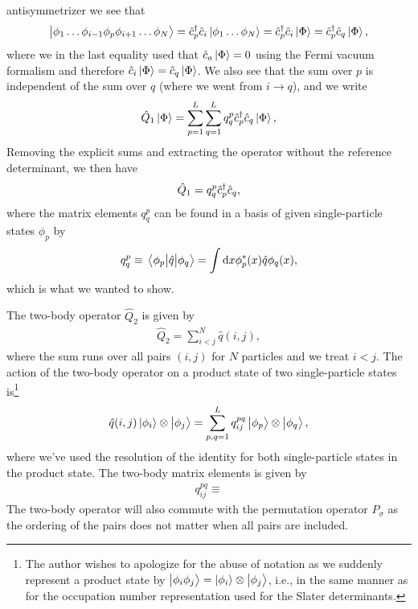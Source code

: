         antisymmetrizer we see that
        \begin{align}
            \ket{\phi_1\dots\phi_{i - 1}\phi_p\phi_{i + 1}\dots\phi_N}
            = \hat{c}_{p}^{\dagger}\hat{c}_{i}\ket{\phi_1\dots\phi_N}
            = \hat{c}_{p}^{\dagger}\hat{c}_{i}\ket{\Phi}
            = \hat{c}_{p}^{\dagger}\hat{c}_{q}\ket{\Phi},
        \end{align}
        where we in the last equality used that $\hat{c}_{a}\ket{\Phi} = 0$ using
        the Fermi vacuum formalism and therefore $\hat{c}_{i}\ket{\Phi} =
        \hat{c}_{q}\ket{\Phi}$.
        We also see that the sum over $p$ is independent of the sum over
        $q$ (where we went from $i \to q$), and we write
        \begin{align}
            \hat{Q}_1\ket{\Phi}
            = \sum_{p = 1}^{L}\sum_{q = 1}^{L}q^{p}_{q}
            \hat{c}_{p}^{\dagger}\hat{c}_{q}\ket{\Phi},
        \end{align}
        Removing the explicit sums and extracting the operator without the
        reference determinant, we then have
        \begin{align}
            \hat{Q}_1 = q^{p}_{q}\hat{c}_{p}^{\dagger}\hat{c}_{q},
        \end{align}
        where the matrix elements $q^{p}_{q}$ can be found in a basis of given
        single-particle states $\phi_p$ by
        \begin{align}
            q^{p}_{q}
            \equiv
            \mel{\phi_p}{\hat{q}}{\phi_q}
            = \int\dd x\phi^{*}_{p}(x)\hat{q}\phi_{q}(x),
        \end{align}
        which is what we wanted to show.

        The two-body operator $\hat{Q}_2$ is given by
        \begin{align}
            \hat{Q}_2
            = \sum_{i < j}^{N}
            \hat{q}(i, j),
        \end{align}
        where the sum runs over all pairs $(i, j)$ for $N$ particles and we
        treat $i < j$.
        The action of the two-body operator on a product state of two
        single-particle states is\footnote{%
            The author wishes to apologize for the abuse of notation as we
            suddenly represent a product state by $\ket{\phi_i\phi_j} =
            \ket{\phi_i}\otimes\ket{\phi_j}$, i.e., in the same manner as for
            the occupation number representation used for the Slater
            determinants.
        }
        \begin{align}
            \hat{q}(i, j)\ket{\phi_i}\otimes\ket{\phi_j}
            = \sum_{p, q = 1}^{L}
            q^{pq}_{ij}
            \ket{\phi_p}\otimes\ket{\phi_q},
        \end{align}
        where we've used the resolution of the identity for both single-particle
        states in the product state.
        The two-body matrix elements is given by
        \begin{align}
            q^{pq}_{ij}
            \equiv
        \end{align}
        The two-body operator will also commute with the permutation operator
        $\hat{P}_{\sigma}$ as the ordering of the pairs does not matter when all
        pairs are included.

